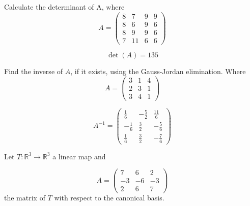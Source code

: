 \begin{questions}

\question Calculate the determinant of A, where
$$
A=\left(\begin{array}{rrrr}
8 & 7 & 9 & 9 \\
8 & 6 & 9 & 6 \\
8 & 9 & 9 & 6 \\
7 & 11 & 6 & 6
\end{array}\right)
$$

\begin{solution}
$$\det(A)=135$$
\end{solution}

\question Find the inverse of $A$, if it exists, using the Gauss-Jordan elimination. Where
$$
A=\left(\begin{array}{rrr}
3 & 1 & 4 \\
2 & 3 & 1 \\
3 & 4 & 1
\end{array}\right)
$$

\begin{solution}
$$A^{-1}=\left(\begin{array}{rrr}
\frac{1}{6} & -\frac{5}{2} & \frac{11}{6} \\
-\frac{1}{6} & \frac{3}{2} & -\frac{5}{6} \\
\frac{1}{6} & \frac{3}{2} & -\frac{7}{6}
\end{array}\right)$$
\end{solution}

\question Let $T:\mathbb{R}^3\rightarrow\mathbb{R}^3$  a linear map and
 
$$
A=\left(\begin{array}{rrr}
7 & 6 & 2 \\
-3 & -6 & -3 \\
2 & 6 & 7
\end{array}\right)
$$
the matrix of $T$ with respect to the canonical basis.
\end{questions}
